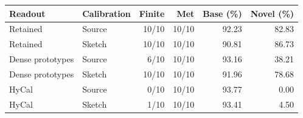\begin{tabular}{@{}llrrrr@{}}
\toprule
Readout & Calibration & Finite & Met & Base (\%) & Novel (\%) \\
\midrule
Retained & Source & 10/10 & 10/10 & 92.23 & 82.83 \\
Retained & Sketch & 10/10 & 10/10 & 90.81 & 86.73 \\
\midrule
Dense prototypes & Source & 6/10 & 10/10 & 93.16 & 38.21 \\
Dense prototypes & Sketch & 10/10 & 10/10 & 91.96 & 78.68 \\
\midrule
HyCal & Source & 0/10 & 10/10 & 93.77 & 0.00 \\
HyCal & Sketch & 1/10 & 10/10 & 93.41 & 4.50 \\
\bottomrule
\end{tabular}
